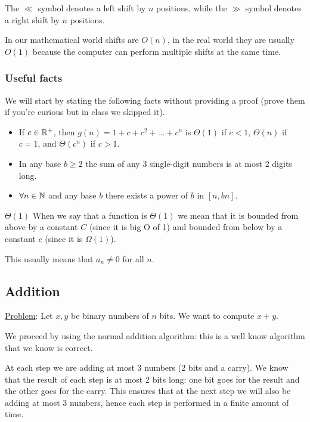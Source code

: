 \documentclass[12pt]{extarticle}
\begin{document}
The $\ll$ symbol denotes a left shift by $n$ positions, while the $\gg$ symbol denotes a right shift by $n$ positions.

In our mathematical world shifts are $O(n)$, in the real world they are usually $O(1)$ because the computer can perform multiple shifts at the same time.

\subsubsection{Useful facts}

We will start by stating the following facts without providing a proof (prove them if you're curious but in class we skipped it).

\begin{itemize}
    \item If $c \in \mathbb{R}^+$, then $g(n) = 1 + c + c^2 + \dots + c^n$ is $\Theta(1)$ if $c < 1$, $\Theta(n)$ if $c = 1$, and $\Theta(c^n)$ if $c > 1$.
    \item In any base $b \ge 2$ the sum of any 3 single-digit numbers is at most 2 digits long.
    \item $\forall n \in \mathbb{N}$ and any base $b$ there exists a power of $b$ in $[n, bn].$
\end{itemize}

\begin{notebox}{$\Theta(1)$}
    When we say that a function is $\Theta(1)$ we mean that it is bounded from above by a constant $C$ (since it is big O of 1)
    and bounded from below by a constant $c$ (since it is $\Omega(1)$).

    This usually means that $a_n \ne 0$ for all $n$.
\end{notebox}

\subsection{Addition}

\underline{Problem}: Let $x, y$ be binary numbers of $n$ bits. We want to compute $x + y$.

We proceed by using the normal addition algorithm: this is a well know algorithm that we know is correct.

At each step we are adding at most 3 numbers (2 bits and a carry).
We know that the result of each step is at most 2 bits long: one bit goes for the result and the other goes for the carry.
This ensures that at the next step we will also be adding at most 3 numbers, hence each step is performed in a finite amount of time.
\end{document}
